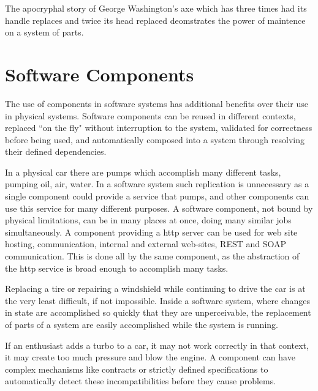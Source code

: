 
The apocryphal story of George Washington's axe which has three times had its handle replaces and twice its head replaced deomstrates the power of maintence on a system of parts.


\section{Software Components}
{}The use of components in software systems has additional benefits over their use in physical systems.
{}Software components can be reused in different contexts, replaced ``on the fly" without interruption to the system, validated for correctness before being used, 
{}and automatically composed into a system through resolving their defined dependencies.

In a physical car there are pumps which accomplish many different tasks, pumping oil, air, water.
In a software system such replication is unnecessary as a single component could provide a service that pumps, 
and other components can use this service for many different purposes.
A software component, not bound by physical limitations, can be in many places at once, doing many similar jobs simultaneously.
A component providing a http server can be used for web site hosting, communication, internal and external web-sites, REST and SOAP communication.
This is done all by the same component, as the abstraction of the http service is broad enough to accomplish many tasks.

Replacing a tire or repairing a windshield while continuing to drive the car is at the very least difficult, if not impossible.
Inside a software system, where changes in state are accomplished so quickly that they are unperceivable, the replacement of parts of a system are easily accomplished while the system is running.

If an enthusiast adds a turbo to a car, it may not work correctly in that context, it may create too much pressure and blow the engine.
A component can have complex mechanisms like contracts or strictly defined specifications to automatically detect these incompatibilities before they cause problems.

